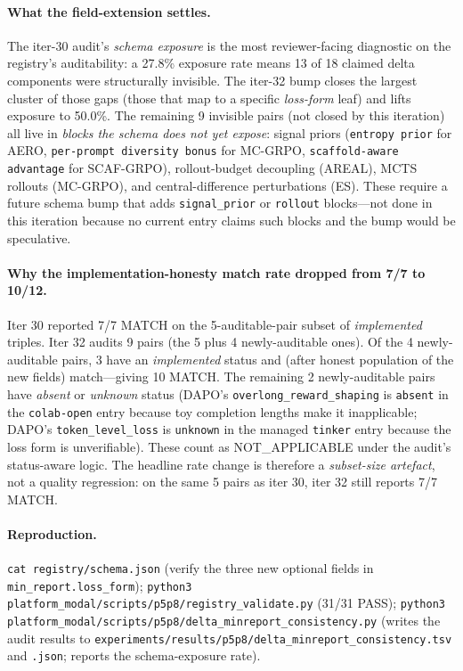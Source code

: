 \documentclass{article}
\begin{document}
\paragraph{What the field-extension settles.} The iter-30 audit's
\emph{schema exposure} is the most reviewer-facing diagnostic on the
registry's auditability: a 27.8\% exposure rate means 13 of 18
claimed delta components were structurally invisible. The iter-32 bump
closes the largest cluster of those gaps (those that map to a
specific \emph{loss-form} leaf) and lifts exposure to 50.0\%. The
remaining 9 invisible pairs (not closed by this iteration) all live in
\emph{blocks the schema does not yet expose}: signal priors
(\texttt{entropy prior} for AERO, \texttt{per-prompt diversity bonus}
for MC-GRPO, \texttt{scaffold-aware advantage} for SCAF-GRPO),
rollout-budget decoupling (AREAL), MCTS rollouts (MC-GRPO), and
central-difference perturbations (ES). These require a future
schema bump that adds \texttt{signal\_prior} or \texttt{rollout}
blocks---not done in this iteration because no current entry claims such
blocks and the bump would be speculative.

\paragraph{Why the implementation-honesty match rate dropped from 7/7
to 10/12.} Iter 30 reported 7/7 MATCH on the 5-auditable-pair subset
of \emph{implemented} triples. Iter 32 audits 9 pairs (the 5 plus 4
newly-auditable ones). Of the 4 newly-auditable pairs, 3 have an
\emph{implemented} status and (after honest population of the new
fields) match---giving 10 MATCH. The remaining 2 newly-auditable
pairs have \emph{absent} or \emph{unknown} status (DAPO's
\texttt{overlong\_reward\_shaping} is \texttt{absent} in the
\texttt{colab-open} entry because toy completion lengths make it
inapplicable; DAPO's \texttt{token\_level\_loss} is \texttt{unknown}
in the managed \texttt{tinker} entry because the loss form is
unverifiable). These count as NOT\_APPLICABLE under the audit's
status-aware logic. The headline rate change is therefore a
\emph{subset-size artefact}, not a quality regression: on the same 5
pairs as iter 30, iter 32 still reports 7/7 MATCH.

\paragraph{Reproduction.} \texttt{cat registry/schema.json} (verify the
three new optional fields in \texttt{min\_report.loss\_form});
\texttt{python3 platform_modal/scripts/p5p8/registry\_validate.py} (31/31 PASS);
\texttt{python3 platform_modal/scripts/p5p8/delta\_minreport\_consistency.py}
(writes the audit results to
\texttt{experiments/results/p5p8/delta\_minreport\_consistency.tsv}
and \texttt{.json}; reports the schema-exposure rate).
\end{document}
